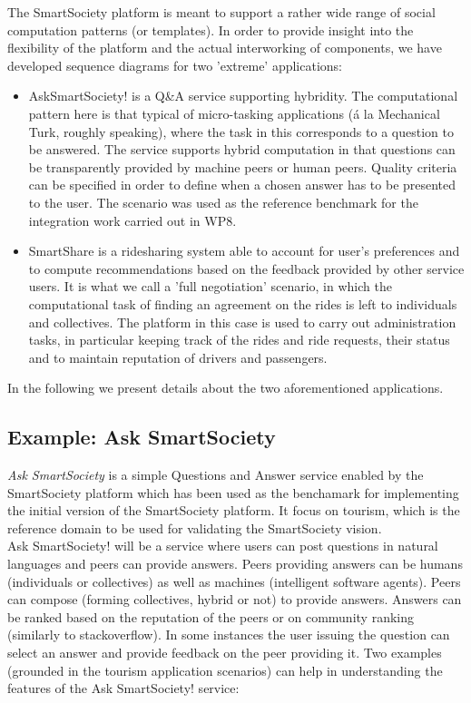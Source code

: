 The SmartSociety platform is meant to support a rather wide range of
social computation patterns (or templates). In order to provide
insight into the flexibility of the platform and the actual
interworking of components, we have developed sequence diagrams for two
'extreme' applications:
\begin{itemize}
\item AskSmartSociety! is a Q\&A service supporting hybridity. The
computational pattern here is that typical of micro-tasking
applications (\'a la Mechanical Turk, roughly speaking), where the
task in this corresponds to a question to be answered. The service
supports hybrid computation in that questions can be transparently
provided by machine peers or human peers. Quality criteria can be
specified in order to define when a chosen answer has to be presented
to the user. The scenario was used as the reference benchmark for the integration work carried out in WP8.

\item SmartShare is a ridesharing system able to account for user's
preferences and to compute recommendations based on the feedback
provided by other service users. It is what we call a 'full
negotiation' scenario, in which the computational task of finding an
agreement on the rides is left to individuals and collectives. The
platform in this case is used to carry out administration tasks, in
particular keeping track of the rides and ride requests, their status
and to maintain reputation of drivers and passengers.
\end{itemize}
In the following we present details about the two aforementioned
applications. 


\subsection{Example: Ask SmartSociety}\label{sec:asksmartsoc}
\textit{Ask SmartSociety} is a simple Questions and Answer service enabled by the SmartSociety platform which has been used as the benchamark for implementing the initial version of the SmartSociety platform. It focus on tourism, which is the reference domain to be used for validating the SmartSociety vision.\\
Ask SmartSociety! will be a service where users can post questions in natural languages and peers can provide answers. Peers providing answers can be humans (individuals or collectives) as well as machines (intelligent software agents). Peers can compose (forming collectives, hybrid or not) to provide answers. Answers can be ranked based on the reputation of the peers or on community ranking (similarly to stackoverflow). In some instances the user issuing the question can select an answer and provide feedback on the peer providing it.
Two examples (grounded in the tourism application scenarios) can help in understanding the features of the Ask SmartSociety! service:


